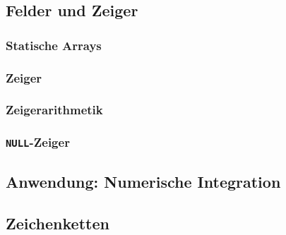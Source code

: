 \subsection{Felder und Zeiger}
\iflecturer
\begin{framed}
  
  \slide{}
  \blackboard{}
\end{framed}
\fi

\subsubsection{Statische Arrays}

\subsubsection{Zeiger}

\subsubsection{Zeigerarithmetik}

\subsubsection{\texttt{NULL}-Zeiger}

\subsection{Anwendung: Numerische Integration}

\iflecturer
\begin{framed}
\end{framed}
\fi

\subsection{Zeichenketten}

\iflecturer
\begin{framed}
\end{framed}
\fi
